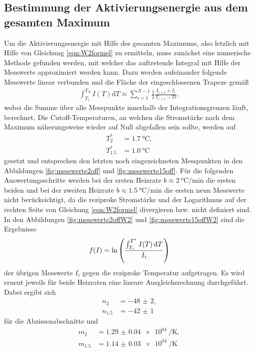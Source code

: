 \subsection{Bestimmung der Aktivierungsenergie aus dem gesamten Maximum}

Um die Aktivierungsenergie mit Hilfe des gesamten Maximums, also letzlich mit Hilfe
von Gleichung \ref{eqn:W2formel} zu ermitteln, muss zunächst eine numerische Methode
gefunden werden, mit welcher das auftretende Integral mit Hilfe der Messwerte
approximiert werden kann. Dazu werden aufeinander folgende Messwerte linear
verbunden und die Fläche der eingeschlossenen Trapeze gemäß
\begin{align}
  \int_{T_1}^{T_N} I(T) \mathrm{d}T \approx \sum_{i=1}^{N-1} \frac12 \frac{I_{i+1}+I_{i}}{T_{i+1}-T{i}},
\end{align}
wobei die Summe über alle Messpunkte innerhalb der Integrationsgrenzen läuft, berechnet.
Die Cutoff-Temperaturen, an welchen die Stromstärke nach dem Maximum näherungsweise wieder auf Null
abgefallen sein sollte, werden auf
\begin{align}
  T^*_{2} &= \SI{1.7}{\celsius}, \\
  T^*_{1.5} &= \SI{1.0}{\celsius}
\end{align}
gesetzt und entsprechen den letzten noch eingezeichneten Messpunkten in den Abbildungen
\ref{fig:messwerte2off} und \ref{fig:messwerte15off}. Für die folgenden Auswertungsschritte
werden bei der ersten Heizrate $b \approx \SI{2}{\celsius\per\minute}$ die ersten beiden
und bei der zweiten Heizrate $b \approx \SI{1.5}{\celsius\per\minute}$ die ersten neun Messwerte
nicht berücksichtigt, da die reziproke Stromstärke und der Logarithmus auf der rechten Seite
von Gleichung \eqref{eqn:W2formel} divergieren bzw. nicht definiert sind.
In den Abbildungen \ref{fig:messwerte2offW2} und \ref{fig:messwerte15offW2} sind die Ergebnisse
\begin{align}
  f(I) = \ln \left(\frac{\int_{T_i}^{T^*} I(T)\mathop{}\!\mathrm{d} T}{I_i}\right)
  \label{eqn:auftrag}
\end{align}
der übrigen Messwerte $I_{i}$ gegen die reziproke Temperatur aufgetragen. Es wird erneut
jeweils für beide Heizraten eine lineare Ausgleichsrechnung durchgeführt. Dabei ergibt sich
\begin{align}
  n_{2} &= \num{-48(2)}, \\
  n_{1.5} &= \num{-42(1)}
\end{align}
für die Abzissenabschnitte und
\begin{align}
  m_{2} &= \SI{1.29(4)e04}{\per\kelvin}, \\
  m_{1.5} &= \SI{1.14(3)e04}{\per\kelvin}
\end{align}
